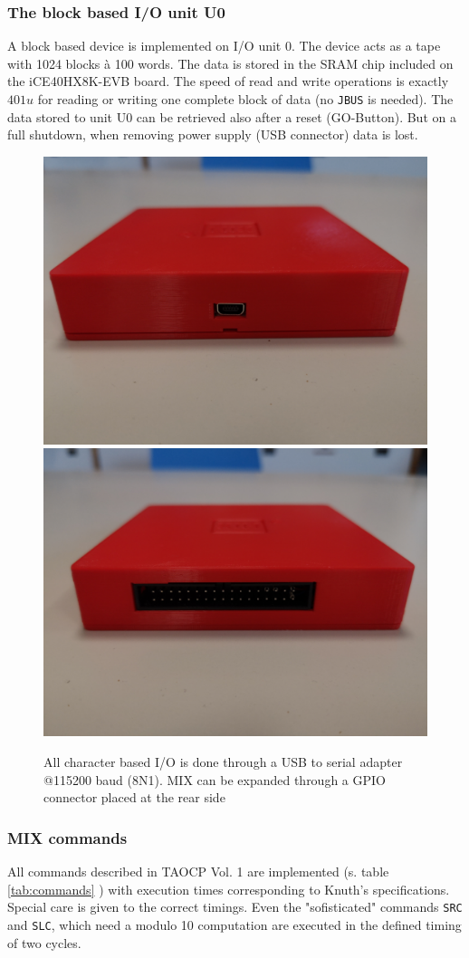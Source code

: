 \documentclass[a4paper,ngerman]{scrartcl}
\begin{document}
\subsubsection{The block based I/O unit U0}

A block based device is implemented on I/O unit 0. The device acts as a tape with 1024 blocks à 100 words. The data is stored in the SRAM chip included on the iCE40HX8K-EVB board. The speed of read and write operations is exactly $401 u$ for reading or writing one complete block of data (no \lstinline|JBUS| is needed). The data stored to unit U0 can be retrieved also after a reset (GO-Button). But on a full shutdown, when removing power supply (USB connector) data is lost.

\begin{figure}
	\centering
	\includegraphics[width=0.45\linewidth]{MIX_usb.jpg}
	\includegraphics[width=0.45\linewidth]{MIX_gpio.jpg}
	
	\caption{All character based I/O is done through a USB to serial adapter @115200 baud (8N1). MIX can be expanded through a GPIO connector placed at the rear side }
	\label{fig:mixusb}
\end{figure}



\subsubsection{MIX commands}
All commands described in TAOCP Vol. 1 are implemented (s. table \ref{tab:commands} ) with execution times corresponding to Knuth's specifications. Special care is given to the correct timings. Even the "sofisticated" commands \lstinline|SRC| and \lstinline|SLC|, which need a modulo 10 computation are executed in the defined timing of two cycles.
\end{document}

